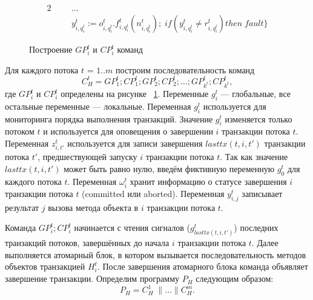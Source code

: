 \begin{myproof}
\begin{figure}
\begin{itemize}
\begin{alignat}{2}
         &           &&\ldots \nonumber \\
         &           &&y^t_{i,q^t_i} := o^t_{i,q^t_i}.f^t_{i,q^t_i}(n^t_{i,q^t_i}); \; if \left (y^t_{i,q^t_i} \neq r^t_{i,q^t_i}\right) then \; fault\} \nonumber
\end{alignat}
\end{itemize}
\caption{Построение $GP^t_i$ и $CP^t_i$ команд}
\label{fig:commands}
\end{figure}
Для каждого потока $t$ = $1..m$ построим последовательность команд $$C^t_H = GP^t_1;CP^t_1;GP^t_2;CP^t_2;\ldots;GP^t_{k^t};CP^t_{k^t},$$ где $GP^t_i$ и $CP^t_i$ определены на рисунке ~\ref{fig:commands}.
Переменные $g^t_i$ --- глобальные, все остальные переменные --- локальные. Переменная $g^t_i$ используется для мониторинга порядка выполнения транзакций. Значение $g^t_i$ изменяется только потоком $t$ и используется для оповещения о завершении $i$ транзакции потока $t$. Переменная $z^t_{i,t'}$ используется для записи завершения $lasttx(t, i, t')$ транзакции потока $t'$, предшествующей запуску $i$ транзакции потока $t$. Так как значение $lasttx(t, i, t')$ может быть равно нулю, введём фиктивную переменную $g^t_0$ для каждого потока $t$. Переменная $\omega^t_i$ хранит информацию о статусе завершения $i$ транзакции потока $t$ (committed или aborted). Переменная $y^t_{i,j}$ записывает результат $j$ вызова метода объекта в $i$ транзакции потока $t$. 

Команда $GP^t_i;CP^t_i$ начинается с чтения сигналов ($g^t_{lasttx(t,i,t')}$) последних транзакций потоков, завершённых до начала $i$ транзакции потока $t$. Далее выполняется атомарный блок, в котором вызывается последовательность методов объектов транзакцией $H^t_i$. После завершения атомарного блока команда объявляет завершение транзакции. Определим программу $P_H$ следующим образом: $$P_H = C^1_H \; \parallel \ldots \parallel C^m_H.$$


\end{myproof}
